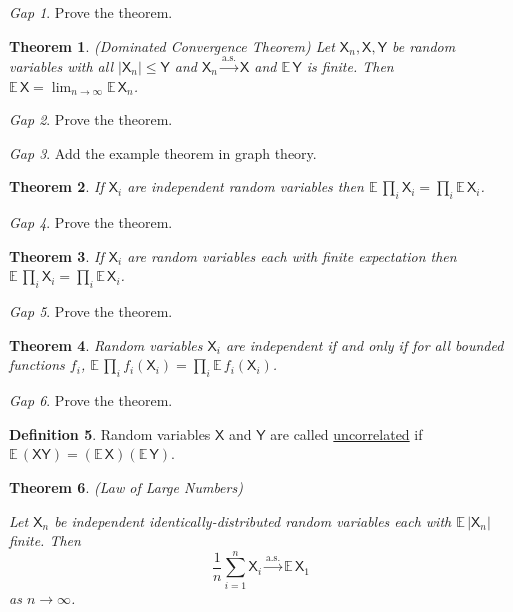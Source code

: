 \documentclass[11pt]{article}
\newcommand{\rv}[1]{\mathsf{#1}}
\newcommand{\ex}{\mathbb{E}\,}
\newcommand{\defname}[1]{\underline{#1}}
\newcommand{\asto}{\xrightarrow{\text{a.s.}}}
\theoremstyle{theorem}
\newtheorem{theorem}{Theorem}[section]
\theoremstyle{definition}
\newtheorem{definition}[theorem]{Definition}
\theoremstyle{remark}
\theoremstyle{step}
\theoremstyle{gap}
\newtheorem*{gap}{Gap}
\begin{document}
\begin{gap}
Prove the theorem.
\end{gap}

\begin{theorem}{(Dominated Convergence Theorem)}
Let \(\rv{X}_n, \rv{X}, \rv{Y}\) be random variables with all \(|\rv{X}_n| \leq \rv{Y}\) and \(\rv{X}_n \asto \rv{X}\) and \(\ex \rv{Y}\) is finite. Then \(\ex \rv{X} = \lim_{n \to \infty} \ex \rv{X}_n\).
\end{theorem}

\begin{gap}
Prove the theorem.
\end{gap}

\begin{gap}
Add the example theorem in graph theory.
\end{gap}

\begin{theorem}
If \(\rv{X}_i\) are independent random variables then \(\ex \prod_i \rv{X}_i = \prod_i \ex \rv{X}_i\).
\end{theorem}

\begin{gap}
Prove the theorem.
\end{gap}

\begin{theorem}
If \(\rv{X}_i\) are random variables each with finite expectation then \(\ex \prod_i \rv{X}_i = \prod_i \ex \rv{X}_i\).
\end{theorem}

\begin{gap}
Prove the theorem.
\end{gap}

\begin{theorem}
Random variables \(\rv{X}_i\) are independent if and only if for all bounded functions \(f_i\), \(\ex \prod_i f_i(\rv{X}_i) = \prod_i \ex f_i(\rv{X}_i)\).
\end{theorem}

\begin{gap}
Prove the theorem.
\end{gap}

\begin{definition}
Random variables \(\rv{X}\) and \(\rv{Y}\) are called \defname{uncorrelated} if \(\ex (\rv{X} \rv{Y}) = (\ex \rv{X})(\ex \rv{Y})\).
\end{definition}

\begin{theorem}{(Law of Large Numbers)}\ 

Let \(\rv{X}_n\) be independent identically-distributed random variables each with \(\ex |\rv{X}_n|\) finite. Then \[\frac{1}{n} \sum_{i=1}^n \rv{X}_i \asto \ex \rv{X}_1\] as \(n \to \infty\).
\end{theorem}
\end{document}
